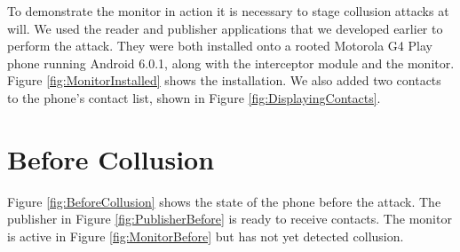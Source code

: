 To demonstrate the monitor in action it is necessary to stage collusion attacks at will.  We used the reader and publisher applications that we developed earlier to perform the attack.  They were both installed onto a rooted Motorola G4 Play phone running Android 6.0.1, along with the interceptor module and the monitor.  Figure \ref{fig:MonitorInstalled} shows the installation.  We also added two contacts to the phone's contact list, shown in Figure \ref{fig:DisplayingContacts}.

\section{Before Collusion}

Figure \ref{fig:BeforeCollusion} shows the state of the phone before the attack.  The publisher in Figure \ref{fig:PublisherBefore} is ready to receive contacts.  The monitor is active in Figure \ref{fig:MonitorBefore} but has not yet detected collusion.\\

